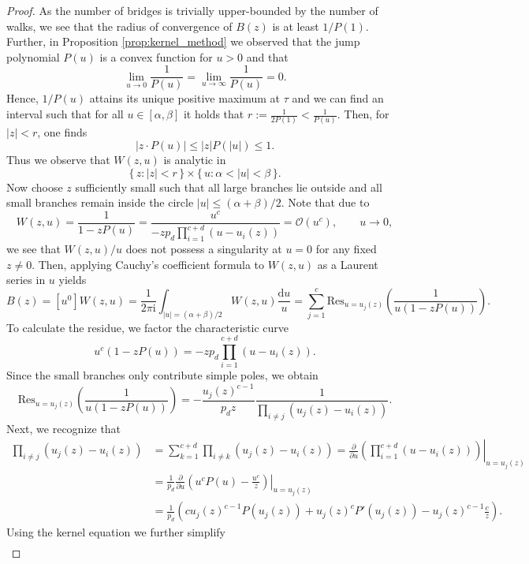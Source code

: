 \begin{proof}
  As the number of bridges is trivially upper-bounded by the number of walks, we see that the radius of convergence of $B(z)$ is at least $1/P(1)$. Further, in Proposition \ref{prop:kernel_method} we observed that the jump polynomial $P(u)$ is a convex function for $u > 0$ and that
  $$
    \lim_{u \to 0} \frac{1}{P(u)} = \lim_{u \to \infty} \frac{1}{P(u)} = 0.
  $$
  Hence, $1/P(u)$ attains its unique positive maximum at $\tau$ and we can find an interval such that for all $u \in [\alpha, \beta]$ it holds that
  $r := \frac{1}{2P(1)} < \frac{1}{P(u)}$. Then, for $|z| < r$, one finds
  $$
    |z \cdot P(u)| \leq |z| P(|u|) \leq 1.
  $$
  Thus we observe that $W(z,u)$ is analytic in 
  $$
    \{\, z: |z| < r \,\} \times \{\, u: \alpha < |u| < \beta \,\}.
  $$
  Now choose $z$ sufficiently small such that all large branches lie outside and all small branches remain inside the circle $|u| \leq (\alpha + \beta)/2$. Note that due to
  $$
    W(z,u) = \frac{1}{1 - zP(u)} = \frac{u^c}{-zp_d \prod_{i=1}^{c+d}(u - u_i(z))} = \mathcal{O}(u^c), \qquad u \to 0,
  $$
  we see that $W(z,u)/u$ does not possess a singularity at $u = 0$ for any fixed $z \neq 0$.
  Then, applying Cauchy's coefficient formula to $W(z,u)$ as a Laurent series in $u$ yields
  $$ 
    B(z) = [u^0] W(z,u) 
    = \frac{1}{2\pi \mathrm{i}}\int_{|u| 
    = (\alpha + \beta)/2} W(z,u) \frac{\mathrm{d}u}{u} 
    = \sum_{j = 1}^c \mathrm{Res}_{u = u_j(z)}
    \left(
      \frac{1}{u(1-zP(u))}
    \right). 
  $$
  To calculate the residue, we factor the characteristic curve 
  $$
    u^c(1 - zP(u)) = -z p_d\prod_{i = 1}^{c+d}(u - u_i(z)).
  $$
  Since the small branches only contribute simple poles, we obtain
  $$
    \mathrm{Res}_{u = u_j(z)}\left(\frac{1}{u(1-zP(u))}\right) 
    = -\frac{u_j(z)^{c-1}}{p_d z}\frac{1}{\prod_{i\neq j}(u_j(z) - u_i(z))}.
  $$
  Next, we recognize that 
  \begin{align*}
      \prod_{i\neq j}(u_j(z) - u_i(z)) &= \sum_{k=1}^{c+d}\prod_{i\neq k}(u_j(z) - u_i(z))
      = \left.\frac{\partial}{\partial u} \left(\prod_{i=1}^{c+d}(u - u_i(z))\right)\right|_{u=u_j(z)} \\
      &= \frac{1}{p_d} \left.\frac{\partial}{\partial u} \left(u^cP(u) - \frac{u^c}{z}\right)\right|_{u=u_j(z)} \\
      &= \frac{1}{p_d}\left(cu_j(z)^{c-1}P(u_j(z)) + u_j(z)^cP'(u_j(z)) - u_j(z)^{c-1}\frac{c}{z}\right).
  \end{align*}
  Using the kernel equation we further simplify
  \begin{align*}

\end{align*}
\end{proof}
